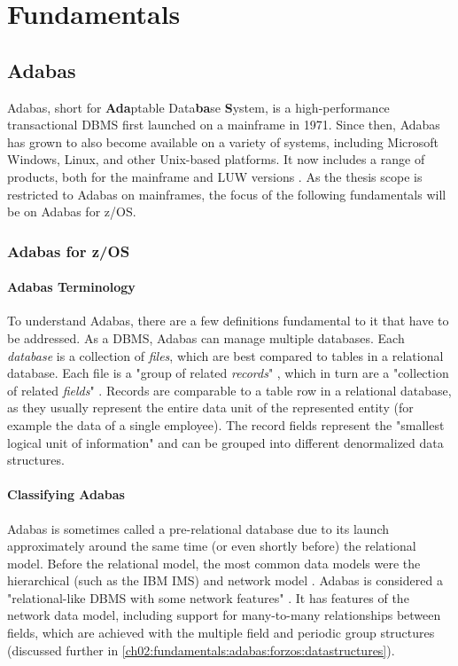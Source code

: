 \chapter{Fundamentals}
\label{ch02:fundamentals}

\section{Adabas}
\label{ch02:fundamentals:adabas}
Adabas, short for \textbf{Ada}ptable Data\textbf{ba}se \textbf{S}ystem, is a high-performance transactional \ac{DBMS} first launched on a mainframe in 1971. Since then, Adabas has grown to also become available on a variety of systems, including Microsoft Windows, Linux, and other Unix-based platforms. It now includes a range of products, both for the mainframe and \ac{LUW} versions \cite{adabasconcepts}. As the thesis scope is restricted to Adabas on mainframes, the focus of the following fundamentals will be on Adabas for z/OS.

\subsection{Adabas for z/OS}
\label{ch02:fundamentals:adabas:forzos}
\subsubsection{Adabas Terminology}
To understand Adabas, there are a few definitions fundamental to it that have to be addressed. As a \ac{DBMS}, Adabas can manage multiple databases. Each \textit{database} is a collection of \textit{files}, which are best compared to tables in a relational database. Each file is a "group of related \textit{records}" \cite{adabasconcepts}, which in turn are a "collection of related \textit{fields}" %
\cite{adabasconcepts}. Records are comparable to a table row in a relational database, as they usually represent the entire data unit of the represented entity (for example the data of a single employee). The record fields represent the "smallest logical unit of information" \cite{adabasconcepts} and can be grouped into different denormalized data structures.

\subsubsection{Classifying Adabas}
\label{ch02:fundamentals:adabas:forzos:classifying}
Adabas is sometimes called a pre-relational database \cite{ibm_redpaper_key} due to its launch approximately around the same time (or even shortly before) the relational model. Before the relational model, the most common data models were the hierarchical (such as the IBM IMS) and network model \cite{stonebrakerwhatgoesaroundcomesaround}. Adabas is considered a "relational-like \ac{DBMS} with some network features" \cite{adabashybrid}. It has features of the network data model, including support for many-to-many relationships between fields, which are achieved with the multiple field and periodic group structures (discussed further in \ref{ch02:fundamentals:adabas:forzos:datastructures}).

